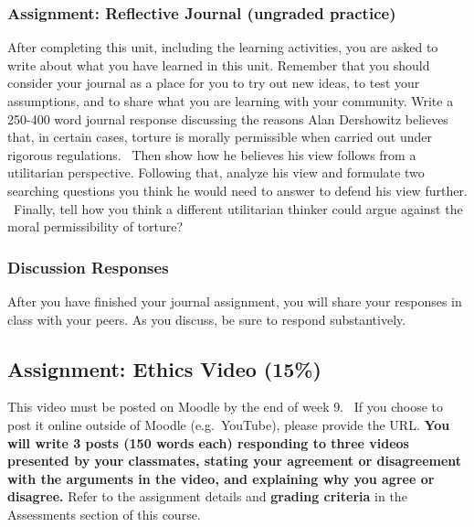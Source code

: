 \documentclass[
]{book}
\begin{document}
\begin{assessment}
\hypertarget{assignment-reflective-journal-ungraded-practice-3}{%
\subsubsection*{Assignment: Reflective Journal (ungraded practice)}\label{assignment-reflective-journal-ungraded-practice-3}}

After completing this unit, including the learning activities, you are asked to write about what you have learned in this unit. Remember that you should consider your journal as a place for you to try out new ideas, to test your assumptions, and to share what you are learning with your community.
Write a 250-400 word journal response discussing the reasons Alan Dershowitz believes that, in certain cases, torture is morally permissible when carried out under rigorous regulations. ~Then show how he believes his view follows from a utilitarian perspective. Following that, analyze his view and formulate two searching questions you think he would need to answer to defend his view further. ~Finally, tell how you think a different utilitarian thinker could argue against the moral permissibility of torture?

\hypertarget{discussion-responses-4}{%
\subsubsection*{Discussion Responses}\label{discussion-responses-4}}

After you have finished your journal assignment, you will share your responses in class with your peers. As you discuss, be sure to respond substantively.

\hypertarget{assignment-ethics-video-15}{%
\subsection*{Assignment: Ethics Video (15\%)}\label{assignment-ethics-video-15}}

This video must be posted on Moodle by the end of week 9. ~If you choose to post it online outside of Moodle (e.g.~YouTube), please provide the URL. \textbf{You will write 3 posts (150 words each) responding to three videos presented by your classmates, stating your agreement or disagreement with the arguments in the video, and explaining why you agree or disagree.} Refer to the assignment details and \textbf{grading criteria} in the Assessments section of this course.
\end{assessment}
\end{document}
